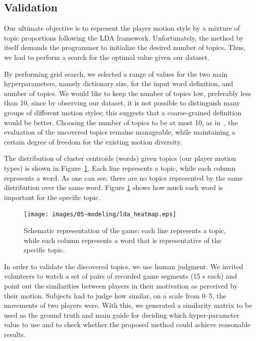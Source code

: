 {\subsection{Validation}

Our ultimate objective is to represent the player motion style by a mixture of topic proportions following the LDA framework. Unfortunately, the method by itself demands the programmer to initialize the desired number of topics. Thus, we had to perform a search for the optimal value given our dataset.

By performing grid search, we selected a range of values for the two main hyperparameters, namely dictionary size, for the input word definition, and number of topics. We would like to keep the number of topics low, preferably less than 10, since by observing our dataset, it is not possible to distinguish many groups of different motion styles; this suggests that a coarse-grained definition would be better. Choosing the number of topics to be at most 10, as in~\cite{smith_mining_2016}, the evaluation of the uncovered topics remains manageable, while maintaining a certain degree of freedom for the existing motion diversity.

The distribution of cluster centroids (words) given topics (our player motion types) is shown in Figure~\ref{overallgame}.
Each line represents a topic, while each column represents a word. As one can see, there are no topics represented by the same distribution over the same word. Figure \ref{overallgame} shows how much each word is important for the specific topic.

\begin{figure}[H]
	\centering
	\texttt{[image: images/05-modeling/lda\_heatmap.eps]}
	\caption{Schematic representation of the game: each line represents a topic, while each column represents a word that is representative of the specific topic.}
  \label{overallgame}
\end{figure}

In order to validate the discovered topics, we use human judgment. We invited volunteers to watch a set of pairs of recorded game segments (15 s each) and point out the similarities between players in their motivation as perceived by their motion. Subjects had to judge how similar, on a scale from 0--5, the movements of two players were. With this, we generated a similarity matrix to be used as the ground truth and main guide for deciding which hyper-parameter value to use and to check whether the proposed method could achieve reasonable results.

}
